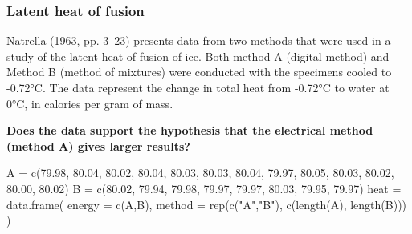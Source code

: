\documentclass[a4paper]{article}\usepackage[]{graphicx}\usepackage[]{xcolor}
\begin{document}
\subsubsection{Latent heat of fusion}
Natrella (1963, pp. 3--23) presents data from two methods that were used in a study of the latent heat of fusion of ice. Both method A (digital method) and Method B (method of mixtures) were conducted with the specimens cooled to -0.72°C. The data represent the change in total heat from -0.72°C to water at 0°C, in calories per gram of mass.
\begin{greenbox}
	\textbf{Does the data support the hypothesis that the electrical method (method A) gives larger results?}
\end{greenbox}
\begin{Schunk}
\begin{Sinput}
A = c(79.98, 80.04, 80.02, 80.04, 80.03, 80.03, 80.04, 
      79.97, 80.05, 80.03, 80.02, 80.00, 80.02)
B = c(80.02, 79.94, 79.98, 79.97, 79.97, 80.03, 79.95, 
      79.97)
heat = data.frame(
  energy = c(A,B),
  method = rep(c("A","B"), c(length(A), length(B)))
)
\end{Sinput}
\end{Schunk}
\end{document}
